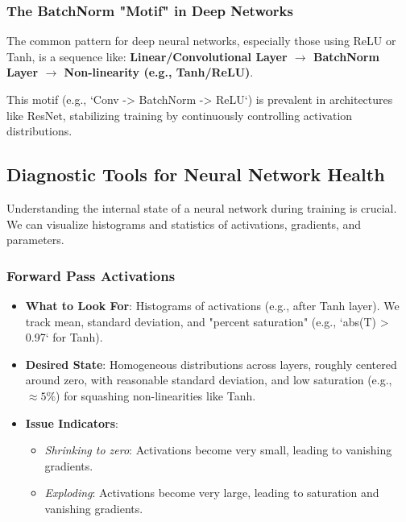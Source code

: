 \subsubsection{The BatchNorm "Motif" in Deep Networks}
The common pattern for deep neural networks, especially those using ReLU or Tanh, is a sequence like:
\textbf{Linear/Convolutional Layer $\rightarrow$ BatchNorm Layer $\rightarrow$ Non-linearity (e.g., Tanh/ReLU)}.

This motif (e.g., `Conv -> BatchNorm -> ReLU`) is prevalent in architectures like ResNet, stabilizing training by continuously controlling activation distributions.

\subsection{Diagnostic Tools for Neural Network Health}

Understanding the internal state of a neural network during training is crucial. We can visualize histograms and statistics of activations, gradients, and parameters.

\subsubsection{Forward Pass Activations}
\begin{itemize}
    \item \textbf{What to Look For}: Histograms of activations (e.g., after Tanh layer). We track mean, standard deviation, and "percent saturation" (e.g., `abs(T) > 0.97` for Tanh).
    \item \textbf{Desired State}: Homogeneous distributions across layers, roughly centered around zero, with reasonable standard deviation, and low saturation (e.g., $\approx 5\%$) for squashing non-linearities like Tanh.
    \item \textbf{Issue Indicators}:
        \begin{itemize}
            \item \textit{Shrinking to zero}: Activations become very small, leading to vanishing gradients.
            \item \textit{Exploding}: Activations become very large, leading to saturation and vanishing gradients.
        \end{itemize}
\end{itemize}

